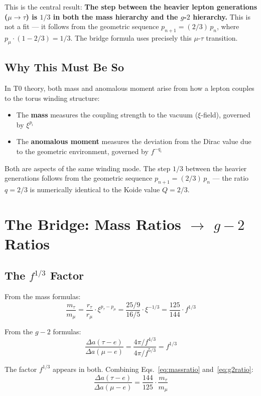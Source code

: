 This is the central result: \textbf{The step between the heavier lepton generations ($\mu\to\tau$) is $1/3$ in both the mass hierarchy and the $g$-$2$ hierarchy.} This is not a fit --- it follows from the geometric sequence $p_{n+1} = (2/3)\,p_n$, where $p_\mu \cdot (1-2/3) = 1/3$. The bridge formula uses precisely this $\mu$-$\tau$ transition.

\subsection{Why This Must Be So}

In T0 theory, both mass and anomalous moment arise from how a lepton couples to the torus winding structure:
\begin{itemize}
	\item The \textbf{mass} measures the coupling strength to the vacuum ($\xi$-field), governed by $\xi^{p_i}$
	\item The \textbf{anomalous moment} measures the deviation from the Dirac value due to the geometric environment, governed by $f^{-q_i}$
\end{itemize}
Both are aspects of the same winding mode. The step $1/3$ between
the heavier generations follows from the geometric sequence
$p_{n+1} = (2/3)\,p_n$ — the ratio $q = 2/3$ is numerically identical
to the Koide value $Q = 2/3$.

\section{The Bridge: Mass Ratios $\to$ $g-2$ Ratios}

\subsection{The $f^{1/3}$ Factor}

From the mass formulas:
\begin{equation}
	\frac{m_\tau}{m_\mu} = \frac{r_\tau}{r_\mu} \cdot \xi^{p_\tau - p_\mu} 
	= \frac{25/9}{16/5} \cdot \xi^{-1/3} = \frac{125}{144} \cdot f^{1/3}
	\label{eq:massratio}
\end{equation}

From the $g-2$ formulas:
\begin{equation}
	\frac{\Delta a(\tau{-}e)}{\Delta a(\mu{-}e)} 
	= \frac{4\pi/f^{4/3}}{4\pi/f^{5/3}} = f^{1/3}
	\label{eq:g2ratio}
\end{equation}

The factor $f^{1/3}$ appears in both. Combining Eqs.~\ref{eq:massratio} and~\ref{eq:g2ratio}:
\begin{equation}
	\boxed{\frac{\Delta a(\tau{-}e)}{\Delta a(\mu{-}e)} = \frac{144}{125} \cdot \frac{m_\tau}{m_\mu}}
	\label{eq:bridge}
\end{equation}

